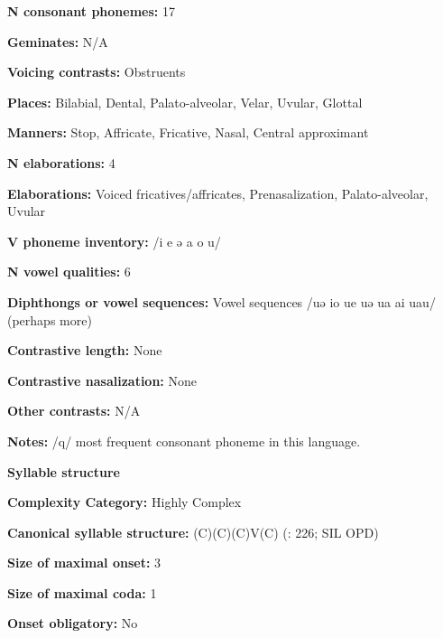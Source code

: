 \textbf{N consonant phonemes:} 17



\textbf{Geminates:} N/A



\textbf{Voicing contrasts:} Obstruents



\textbf{Places:} Bilabial, Dental, Palato-alveolar, Velar, Uvular, Glottal



\textbf{Manners:} Stop, Affricate, Fricative, Nasal, Central approximant



\textbf{N elaborations:} 4



\textbf{Elaborations:} Voiced fricatives/affricates, Prenasalization, Palato-alveolar, Uvular



\textbf{V phoneme inventory:} /i e ə a o u/



\textbf{N vowel qualities:} 6



\textbf{Diphthongs or vowel sequences:} Vowel sequences /uə io ue uə ua ai uau/ (perhaps more)



\textbf{Contrastive length:} None



\textbf{Contrastive nasalization:} None



\textbf{Other contrasts:} N/A



\textbf{Notes:} /q/ most frequent consonant phoneme in this language.



\textbf{Syllable structure}



\textbf{Complexity Category:} Highly Complex



\textbf{Canonical syllable structure:} (C)(C)(C)V(C) (\citealt{Whitehead2004}: 226; SIL OPD)



\textbf{Size of maximal onset:} 3



\textbf{Size of maximal coda:} 1



\textbf{Onset obligatory:} No



